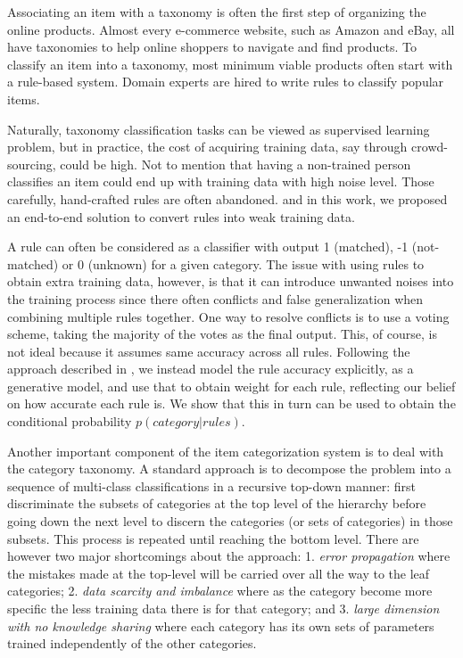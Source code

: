 
Associating an item with a taxonomy is often the first step of organizing the online products. 
Almost every e-commerce website, such as Amazon and eBay, all have taxonomies to help online shoppers to navigate and find products.
To classify an item into a taxonomy, most minimum viable products often start with a rule-based system. 
Domain experts are hired to write rules to classify popular items. 

Naturally,  taxonomy classification tasks can be viewed as supervised learning problem, 
but in practice, the cost of acquiring training data, say through crowd-sourcing, could be high. 
Not to mention that having a non-trained person classifies an item could end up with training 
data with high noise level.
Those carefully, hand-crafted rules are often abandoned.
and in this work, we proposed an end-to-end solution to convert rules into weak training data.

A rule can often be considered as a classifier with output 1 (matched), -1 (not-matched) or 0 (unknown) for a given category. The issue with using rules to obtain extra training data, however, is that it can introduce unwanted noises into the training process since there often conflicts and false generalization when combining multiple rules together. One way to resolve conflicts is to use a voting scheme, taking the majority of the votes as the final output. This, of course, is not ideal because it assumes same accuracy across all rules. Following the approach described in \cite{Ratner2016}, we instead model the rule accuracy explicitly, as a generative model, and use that to obtain weight for each rule, reflecting our belief on how accurate each rule is. We show that this in turn can be used to obtain the conditional probability $p(category | rules)$.

Another important component of the item categorization system is to deal with the category taxonomy. 
A standard approach is to decompose the problem into a sequence of multi-class classifications in a recursive top-down manner\cite{authur2010,cai2004hierarchical}: 
first discriminate the subsets of categories at the top level of the hierarchy before going down the next level to discern the categories (or sets of categories) in those subsets. This process is repeated until reaching the bottom level.  
There are however two major shortcomings about the approach: 1. \emph{error propagation} where the mistakes made at the top-level will be carried over all the way to the leaf categories; 2. \emph{data scarcity and imbalance} where as the category become more specific the less training data there is for that category; and 3. \emph{large dimension with no knowledge sharing} where each category has its own sets of parameters trained independently of the other categories.

